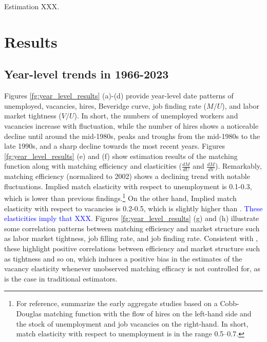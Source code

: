 \documentclass[12pt]{article}
\begin{document}
Estimation XXX.



\section{Results}

\subsection{Year-level trends in 1966-2023}



Figures \ref{fg:year_level_results} (a)-(d) provide year-level date patterns of unemployed, vacancies, hires, Beveridge curve, job finding rate ($M/U$), and labor market tightness ($V/U$). 
In short, the numbers of unemployed workers and vacancies increase with fluctuation, while the number of hires shows a noticeable decline until around the mid-1980s, peaks and troughs from the mid-1980s to the late 1990s, and a sharp decline towards the most recent years.
Figures \ref{fg:year_level_results} (e) and (f) show estimation results of the matching function along with matching efficiency and elasticities ($\frac{dM}{dU}$ and $\frac{dM}{dV}$).
Remarkably, matching efficiency (normalized to 2002) shows a declining trend with notable fluctuations.
Implied match elasticity with respect to unemployment is 0.1-0.3, which is lower than previous findings.\footnote{For reference, \cite{petrongolo2001looking} summarize the early aggregate studies based on a Cobb-Douglas matching function with the flow of hires on the left-hand side and the stock of unemployment and job vacancies on the right-hand. In short, match elasticity with respect to unemployment is in the range 0.5–0.7.} 
On the other hand, Implied match elasticity with respect to vacancies is 0.2-0.5, which is slightly higher than \cite{lange2020beyond}.
\textcolor{blue}{These elasticities imply that XXX.}
Figures \ref{fg:year_level_results} (g) and (h) illustrate some correlation patterns between matching efficiency and market structure such as labor market tightness, job filling rate, and job finding rate.
Consistent with \cite{lange2020beyond}, these highlight positive correlations between efficiency and market structure such as tightness and so on, which induces a positive bias in the estimates of the vacancy elasticity whenever unobserved matching efficacy is not controlled for, as is the case in traditional estimators.
\end{document}
